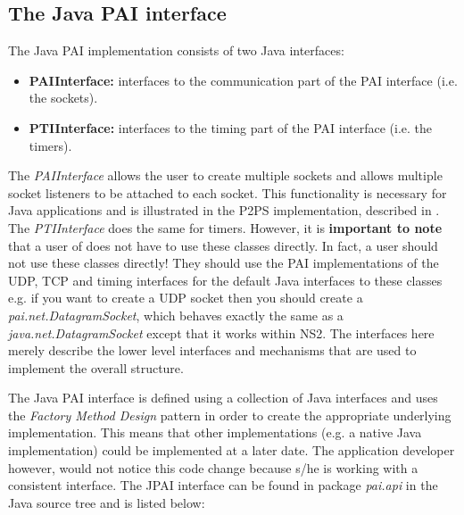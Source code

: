 \subsection{The Java PAI interface}
\label{jnipai:jpai}

The Java PAI implementation consists of two Java interfaces:

\begin{itemize}
\item \textbf{PAIInterface:}  interfaces to the communication part of the 
PAI interface (i.e. the sockets).  
\item \textbf{PTIInterface:}  interfaces to the timing part of the 
PAI interface (i.e. the timers).  
\end{itemize}

 
The \emph{PAIInterface} allows the user to create multiple sockets and 
allows multiple socket listeners to be attached to each socket.  This 
functionality is necessary for Java applications and
is illustrated in the P2PS implementation, described in \cite{p2psx}.
The \emph{PTIInterface} does the same for timers.  However,
it is \textbf{important to note} that a user of \agentj does not have
to use these classes directly. In fact, a user should not use these 
classes directly!  They should use the PAI implementations
of the UDP, TCP and timing interfaces for the default Java 
interfaces to these classes e.g. if you want to create a UDP
socket then you should create a \emph{pai.net.DatagramSocket},
which behaves exactly the same as a 
\emph{java.net.DatagramSocket} except that it works within NS2.
The interfaces here merely describe the lower level interfaces and
mechanisms that are used to implement the overall structure.

The Java PAI interface is defined using a collection of Java 
interfaces and uses the \emph{Factory Method Design} pattern 
\cite{designpatterns} in order to create the appropriate underlying
implementation.  This means that other implementations (e.g. a native
Java implementation) could be implemented at a later date.
The application developer however, would not notice this code
change because s/he is working with a consistent interface.  The
JPAI interface can be found in package \emph{pai.api} in the
Java source tree and is listed below:

